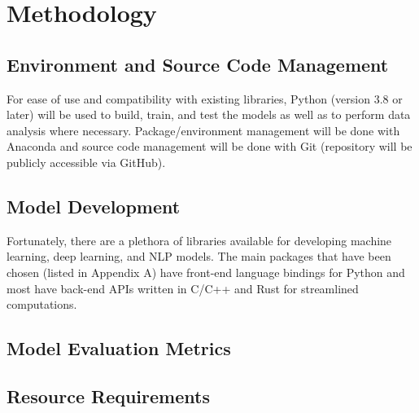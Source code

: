 \documentclass[10pt]{article}
\begin{document}
    \section{Methodology}
        \subsection{Environment and Source Code Management}
            For ease of use and compatibility with existing libraries, Python (version 3.8 or later)
            will be used to build, train, and test the models as well as to perform data analysis
            where necessary.
            Package/environment management will be done with Anaconda and source code management
            will be done with Git (repository will be publicly accessible via GitHub).

        \subsection{Model Development}
            Fortunately, there are a plethora of libraries available for developing machine learning,
            deep learning, and NLP models.
            The main packages that have been chosen (listed in Appendix A) have front-end language
            bindings for Python and most have back-end APIs written in C/C++ and Rust for streamlined computations.

        \subsection{Model Evaluation Metrics}

        \subsection{Resource Requirements}

\end{document}
